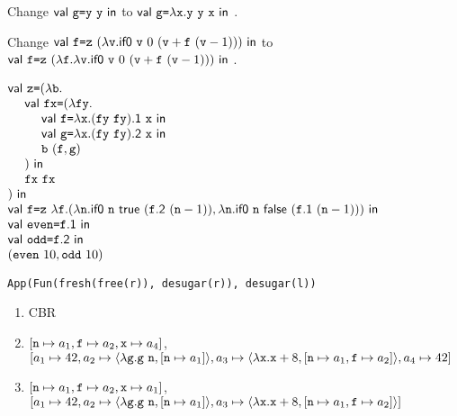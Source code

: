 \textbf{}

Change $\textsf{val}\ \texttt{g}\texttt{=}\texttt{y}\ \texttt{y}\ \textsf{in}\ $to
$\textsf{val}\ \texttt{g}\texttt{=}\lambda\texttt{x}.\texttt{y}\ \texttt{y}\ \texttt{x}\ \textsf{in}\ $\!.
\\

\textbf{}

Change $\textsf{val}\ \texttt{f}\texttt{=}\texttt{z}\ ({\lambda\texttt{v}.\textsf{if0}\ \texttt{v}\ 0\ (\texttt{v}+\texttt{f}\ (\texttt{v}-1))})\ \textsf{in}\ $to
$\textsf{val}\ \texttt{f}\texttt{=}\texttt{z}\ ({\lambda\texttt{f}.\lambda\texttt{v}.\textsf{if0}\ \texttt{v}\ 0\ (\texttt{v}+\texttt{f}\ (\texttt{v}-1))})\ \textsf{in}\ $\!.
\\

\textbf{}

$\begin{array}{@{}l@{}}
  \ebind{\cz}{(\efun{\cb}{\\
  \ \ \ \ \ebind{\code{fx}}{(\efun{\code{fy}}{\\
  \ \ \ \ \ \ \ \ \ebind{\cf}{\efun{\cx}{(\eapp{\code{fy}}{\code{fy}})\textsf{.1}\ \cx}}{\\
  \ \ \ \ \ \ \ \ \ebind{\code{g}}{\efun{\cx}{(\eapp{\code{fy}}{\code{fy}})\textsf{.2}\ \cx}}{\\
  \ \ \ \ \ \ \ \ \eapp{\cb}{(\cf,\code{g})}}}}\\\ \ \ \ )}{\\
  \ \ \ \ \eapp{\code{fx}}{\code{fx}}}}\\)}{\\
  \ebind{\cf}{\eapp{\cz}{\efun{\cf}{(
    \efun{\code{n}}{\eifz{\code{n}}{\true}{(\eapp{\cf\textsf{.2}}{(\esub{\code{n}}{1})})}},
    \efun{\code{n}}{\eifz{\code{n}}{\false}{(\eapp{\cf\textsf{.1}}{(\esub{\code{n}}{1})})}}
  )}}}{\\
  \ebind{\code{even}}{\cf\textsf{.1}}{\\
  \ebind{\code{odd}}{\cf\textsf{.2}}{\\
  (\eapp{\code{even}}{10}, \eapp{\code{odd}}{10})}}}}
\end{array}$
\\

\textbf{}
\vspace{-1em}
\begin{verbatim}
App(Fun(fresh(free(r)), desugar(r)), desugar(l))
\end{verbatim}

\textbf{}
\begin{enumerate}
  \item CBR
  \item
    $[\texttt{n} \mapsto a_1, \texttt{f} \mapsto a_2, \texttt{x} \mapsto a_4]$,\\
$[
    a_1 \mapsto 42,
    a_2 \mapsto \langle\lambda\texttt{g}.\texttt{g}\ \texttt{n},[\texttt{n} \mapsto a_1]\rangle,
    a_3 \mapsto \langle\lambda\texttt{x}.\texttt{x}+8,[\texttt{n} \mapsto a_1, \texttt{f} \mapsto a_2]\rangle,
    a_4 \mapsto 42
]$
  \item
    $[\texttt{n} \mapsto a_1, \texttt{f} \mapsto a_2, \texttt{x} \mapsto a_1]$,\\
$[
    a_1 \mapsto 42,
    a_2 \mapsto \langle\lambda\texttt{g}.\texttt{g}\ \texttt{n},[\texttt{n} \mapsto a_1]\rangle,
    a_3 \mapsto \langle\lambda\texttt{x}.\texttt{x}+8,[\texttt{n} \mapsto a_1, \texttt{f} \mapsto a_2]\rangle
]$
\end{enumerate}

